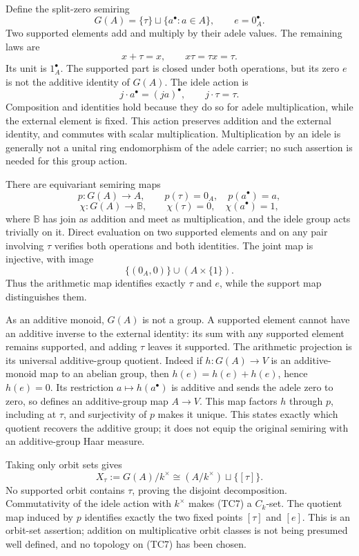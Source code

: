 \documentclass[
  10pt,
]{article}
\begin{document}
Define the split-zero semiring \[
G(A)=\{\tau\}\sqcup\{a^\bullet:a\in A\},\qquad e=0_A^\bullet.
\tag{TC2}
\] Two supported elements add and multiply by their adele values. The
remaining laws are \[
x+\tau=x,\qquad x\tau=\tau x=\tau.
\tag{TC3}
\] Its unit is \(1_A^\bullet\). The supported part is closed under both
operations, but its zero \(e\) is not the additive identity of \(G(A)\).
The idele action is \[
j\cdot a^\bullet=(ja)^\bullet,\qquad j\cdot\tau=\tau.
\tag{TC4}
\] Composition and identities hold because they do so for adele
multiplication, while the external element is fixed. This action
preserves addition and the external identity, and commutes with scalar
multiplication. Multiplication by an idele is generally not a unital
ring endomorphism of the adele carrier; no such assertion is needed for
this group action.

There are equivariant semiring maps \[
p:G(A)\to A,\qquad p(\tau)=0_A,\quad p(a^\bullet)=a,
\] \[
\chi:G(A)\to\mathbb B,\qquad\chi(\tau)=0,\quad\chi(a^\bullet)=1,
\tag{TC5}
\] where \(\mathbb B\) has join as addition and meet as multiplication,
and the idele group acts trivially on it. Direct evaluation on two
supported elements and on any pair involving \(\tau\) verifies both
operations and both identities. The joint map is injective, with image
\[
\{(0_A,0)\}\cup(A\times\{1\}).
\tag{TC6}
\] Thus the arithmetic map identifies exactly \(\tau\) and \(e\), while
the support map distinguishes them.

As an additive monoid, \(G(A)\) is not a group. A supported element
cannot have an additive inverse to the external identity: its sum with
any supported element remains supported, and adding \(\tau\) leaves it
supported. The arithmetic projection is its universal additive-group
quotient. Indeed if \(h:G(A)\to V\) is an additive-monoid map to an
abelian group, then \(h(e)=h(e)+h(e)\), hence \(h(e)=0\). Its
restriction \(a\mapsto h(a^\bullet)\) is additive and sends the adele
zero to zero, so defines an additive-group map \(A\to V\). This map
factors \(h\) through \(p\), including at \(\tau\), and surjectivity of
\(p\) makes it unique. This states exactly which quotient recovers the
additive group; it does not equip the original semiring with an
additive-group Haar measure.

Taking only orbit sets gives \[
X_\tau:=G(A)/k^\times
\cong(A/k^\times)\sqcup\{[\tau]\}.
\tag{TC7}
\] No supported orbit contains \(\tau\), proving the disjoint
decomposition. Commutativity of the idele action with \(k^\times\) makes
(TC7) a \(C_k\)-set. The quotient map induced by \(p\) identifies
exactly the two fixed points \([\tau]\) and \([e]\). This is an
orbit-set assertion; addition on multiplicative orbit classes is not
being presumed well defined, and no topology on (TC7) has been chosen.
\end{document}
